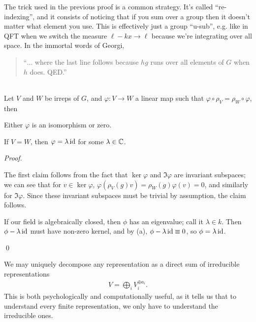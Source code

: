 \documentclass[11pt]{article}
\begin{document}
\begin{nnote}
    The trick used in the previous proof is a common strategy.
    It's called ``re-indexing'', and it consists of
    noticing that if you sum over a group then it doesn't matter what 
    element you use. This is effectively just a group ``u-sub'', e.g. like
    in QFT when we switch the measure $\ell - kx \to \ell$ because we're integrating
    over all space. In the immortal words of Georgi,
    \begin{quote}
        ``$\ldots$ where the last line follows because $hg$ runs over all
        elements of $G$ when $h$ does. QED.''
    \end{quote}
\end{nnote}

\begin{theorem}{}\\
    Let $V$ and $W$ be irreps of $G$, and $\varphi \colon V \to W$
    a linear map such that $ \varphi \circ \rho_V = \rho_W \circ \varphi$, 
    then
    \begin{alphamerate}
        \item Either $\varphi$ is an isomorphism or zero.
        \item If $V = W$, then $\varphi = \lambda \operatorname{id}$ for some $\lambda \in \mathbb{C}$.
    \end{alphamerate}
\end{theorem}

\begin{proof}
    \begin{alphamerate}
        \item The first claim follows from the fact that $\ker{\varphi}$
        and $\Im{\varphi}$ are invariant subspaces; we can see that for
        $v \in \ker{\varphi}$, $\varphi(\rho_V(g) v) = \rho_W(g) \varphi(v) = 0$,
        and similarly for $\Im{\varphi}$. Since these invariant subspaces
        must be trivial by assumption, the claim follows.
        \item If our field is algebraically closed, then $\phi$ has an eigenvalue;
        call it $\lambda \in k$. Then $\phi - \lambda \operatorname{id}$ must have non-zero kernel,
        and by (a), $\phi - \lambda \operatorname{id} \equiv 0$, so $\phi = \lambda \operatorname{id}$.
    \end{alphamerate}
    \qed
\end{proof}

\begin{corollary}
    We may uniquely decompose any representation as a direct
    sum of irreducible representations
    \begin{align*}
        V = \bigoplus_i V_i^{\oplus a_i}.
    \end{align*}
    This is both psychologically and computationally useful,
    as it tells us that to understand every finite representation,
    we only have to understand the irreducible ones.
\end{corollary}
\end{document}
